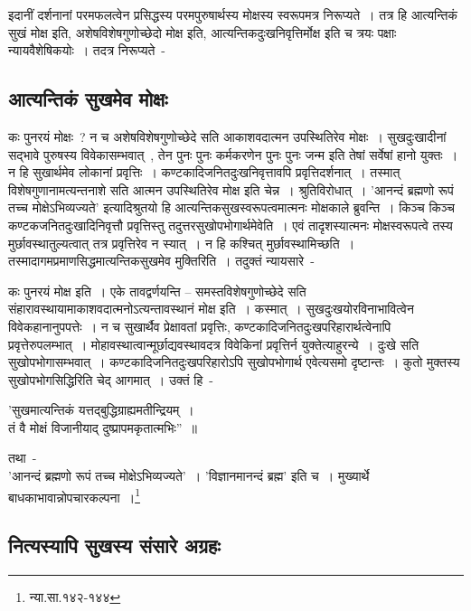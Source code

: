 	इदानीं दर्शनानां परमफलत्वेन प्रसिद्धस्य परमपुरुषार्थस्य मोक्षस्य स्वरूपमत्र निरूप्यते~। तत्र हि आत्यन्तिकं सुखं मोक्ष इति, अशेषविशेषगुणोच्छेदो मोक्ष इति, आत्यन्तिकदुःखनिवृत्तिर्मोक्ष इति च त्रयः पक्षाः न्यायवैशेषिकयोः~। तदत्र निरूप्यते~- 

		\subsection{आत्यन्तिकं सुखमेव मोक्षः}

		कः पुनरयं मोक्षः~? न च अशेषविशेषगुणोच्छेदे सति आकाशवदात्मन उपस्थितिरेव मोक्षः~।‌ सुखदुःखादीनां सद्भावे पुरुषस्य विवेकासम्भवात्~, तेन पुनः पुनः कर्मकरणेन पुनः पुनः जन्म इति तेषां सर्वेषां हानो युक्तः~। न हि सुखार्थमेव लोकानां प्रवृत्तिः~। कण्टकादिजनितदुःखनिवृत्तावपि प्रवृत्तिदर्शनात्~। तस्मात् विशेषगुणानामत्यन्तनाशे सति आत्मन उपस्थितिरेव मोक्ष इति चेन्न~। श्रुतिविरोधात्~। ’आनन्दं ब्रह्मणो रूपं तच्च मोक्षेऽभिव्यज्यते’ इत्यादिश्रुतयो हि आत्यन्तिकसुखस्वरूपत्वमात्मनः मोक्षकाले ब्रुवन्ति~। किञ्च किञ्च कण्टकजनितदुःखादिनिवृत्तौ प्रवृत्तिस्तु तदुत्तरसुखोपभोगार्थमेवेति~। एवं तादृशस्यात्मनः मोक्षस्वरूपत्वे तस्य मुर्छावस्थातुल्यत्वात् तत्र प्रवृत्तिरेव न स्यात्~। न हि कश्चित् मुर्छावस्थामिच्छति~। तस्मादागमप्रमाणसिद्धमात्यन्तिकसुखमेव मुक्तिरिति~। तदुक्तं न्यायसारे~-

		{\fontsize{11.7}{0}\selectfont\s कः पुनरयं मोक्ष इति~। एके तावद्वर्णयन्ति – समस्तविशेषगुणोच्छेदे सति संहारावस्थायामाकाशवदात्मनोऽत्यन्तावस्थानं मोक्ष इति~। कस्मात्~। सुखदुःखयोरविनाभावित्वेन विवेकहानानुपपत्तेः~। न च सुखार्थैव प्रेक्षावतां प्रवृत्तिः, कण्टकादिजनितदुःखपरिहारार्थत्वेनापि प्रवृत्तेरुपलम्भात्~। मोहावस्थात्वान्मूर्छाद्यवस्थावदत्र विवेकिनां प्रवृत्तिर्न युक्तेत्याहुरन्ये~। दुःखे सति सुखोपभोगासम्भवात्~। कण्टकादिजनितदुःखपरिहारोऽपि सुखोपभोगार्थ एवेत्यसमो दृष्टान्तः~। कुतो मुक्तस्य सुखोपभोगसिद्धिरिति चेद् आगमात्~। उक्तं हि~-\\ \begin{center}’सुखमात्यन्तिकं यत्तद्बुद्धिग्राह्यमतीन्द्रियम्~।\\ तं वै मोक्षं विजानीयाद् दुष्प्रापमकृतात्मभिः”~॥\\\end{center} तथा~- \\ ’आनन्दं ब्रह्मणो रूपं तच्च मोक्षेऽभिव्यज्यते’~। ’विज्ञानमानन्दं ब्रह्म’ इति च~। मुख्यार्थे बाधकाभावान्नोपचारकल्पना~।\footnote{न्या.सा.१४२-१४४}}

		\subsection{नित्यस्यापि सुखस्य संसारे अग्रहः}

